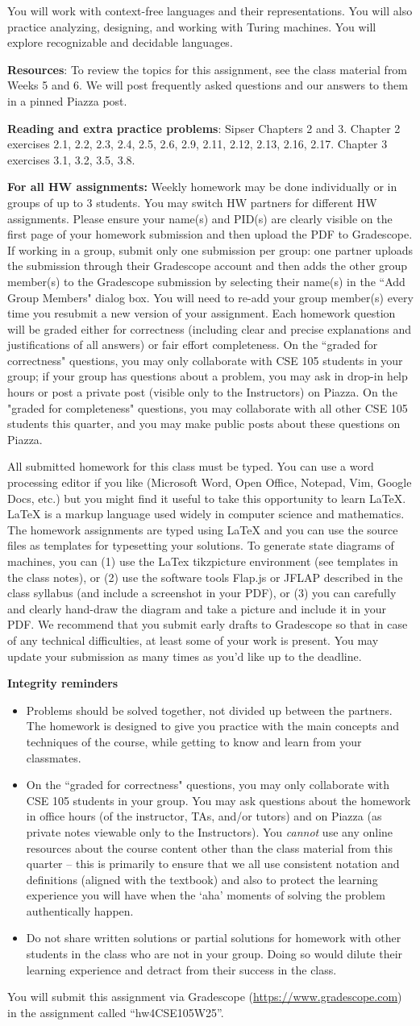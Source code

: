 \documentclass[12pt, oneside]{article}
\newcommand{\instructions}{{\bf For all HW assignments:} Weekly homework 
may be done individually or in groups of up to 3 students. 
You may switch HW partners for different HW assignments. 
Please ensure your name(s) and PID(s) are clearly visible on the first page of your homework submission 
and then upload the PDF to Gradescope. If working in a group, submit only one submission per group: 
one partner uploads the submission through their Gradescope account and then adds the other group member(s) 
to the Gradescope submission by selecting their name(s) in the ``Add Group Members" dialog box. 
You will need to re-add your group member(s) every time you resubmit a new version of your assignment.
 Each homework question will be graded either for correctness (including clear and precise explanations and 
 justifications of all answers) or fair effort completeness. 
 On the ``graded for correctness"
 questions, you may only collaborate with CSE 105 students in your group; if your
 group has questions about a problem, you may ask in drop-in help hours or post a private
post (visible only to the Instructors) on Piazza. On the "graded for completeness" questions, you 
may collaborate with all other CSE 105 students this quarter, and you may make public posts about these questions 
on Piazza.

All submitted homework for this class must be typed. 
You can use a word processing editor if you like (Microsoft Word, Open Office, Notepad, Vim, Google Docs, etc.) 
but you might find it useful to take this opportunity to learn LaTeX. 
LaTeX is a markup language used widely in computer science and mathematics. 
The homework assignments are typed using LaTeX and you can use the source files 
as templates for typesetting your solutions.
To generate state diagrams of machines, you can (1) use the LaTex tikzpicture
environment (see templates in the class notes), or (2) use the software tools Flap.js or
JFLAP described in the class syllabus (and include a screenshot in your PDF), or (3) you can carefully
and clearly hand-draw
the diagram and take a picture and include it in your PDF.
We recommend that you
submit early drafts to Gradescope so that in case of any technical difficulties, at least some of your
work is present. You may update your submission as many times as you'd like up to the deadline.


{\bf Integrity reminders}
\begin{itemize}
\item Problems should be solved together, not divided up between the partners. The homework is
designed to give you practice with the main concepts and techniques of the course, 
while getting to know and learn from your classmates.
\item On the ``graded for correctness"
questions, you may only collaborate with CSE 105 students in your group.
You may ask questions about the homework in office hours (of the instructor, TAs, and/or tutors) and 
on Piazza (as private notes viewable only to the Instructors).  
You \emph{cannot} use any online resources about the course content other than the class material 
from this quarter -- this is primarily to ensure that we all use consistent notation and
definitions (aligned with the textbook) and also to protect the learning experience you will have when
the `aha' moments of solving the problem authentically happen.
\item Do not share written solutions or partial solutions for homework with 
other students in the class who are not in your group. Doing so would dilute their learning 
experience and detract from their success in the class.
\end{itemize}

}
\begin{document}
You will work with context-free languages and their representations.
You will also practice analyzing, designing, and working with Turing machines.
You will explore recognizable and decidable languages.

{\bf Resources}: To review the topics 
for this assignment, see the class material from Weeks 5 and 6.
We will post frequently asked questions and our answers to them in a 
pinned Piazza post. 

{\bf Reading and extra practice problems}:  
Sipser Chapters 2 and 3.
Chapter 2 exercises 2.1, 2.2, 2.3, 2.4, 2.5, 2.6, 2.9, 2.11, 2.12, 2.13, 2.16, 2.17.
Chapter 3 exercises 3.1, 3.2, 3.5, 3.8.

\instructions

You will submit this assignment via Gradescope
(\href{https://www.gradescope.com}{https://www.gradescope.com}) 
in the assignment called ``hw4CSE105W25''.
\end{document}
